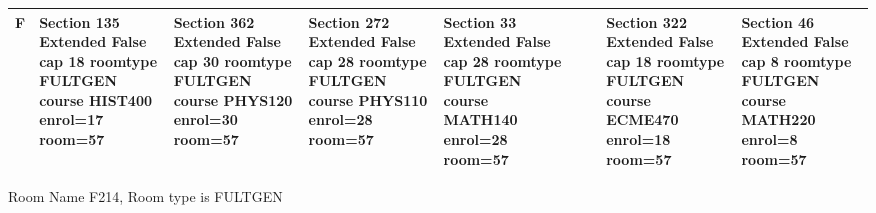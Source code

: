 \documentclass{article} \usepackage[margin=0.5in]{geometry}
\newcommand{\textgr}[1]{\cellcolor{gray!40}\textbf{#1}}
\begin{document}
\begin{tabular}{|c|z|z|z|z|z|z|z|z|}
\hline
\textgr{F} &  Section 135 Extended False cap 18 roomtype FULTGEN course HIST400 enrol=17 room=57 & Section 362 Extended False cap 30 roomtype FULTGEN course PHYS120 enrol=30 room=57 & Section 272 Extended False cap 28 roomtype FULTGEN course PHYS110 enrol=28 room=57 & Section 33 Extended False cap 28 roomtype FULTGEN course MATH140 enrol=28 room=57 &  &  & Section 322 Extended False cap 18 roomtype FULTGEN course ECME470 enrol=18 room=57 & Section 46 Extended False cap 8 roomtype FULTGEN course MATH220 enrol=8 room=57 \\[65pt]
\hline
\end{tabular}

	
Room Name F214, Room type is FULTGEN 
\newpage
	
\end{document}
